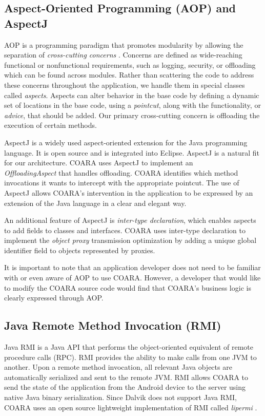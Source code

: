\documentclass[10pt,journal,cspaper,compsoc]{IEEEtran}
\begin{document}
\subsection{Aspect-Oriented Programming (AOP) and AspectJ}
AOP is a programming paradigm that promotes modularity by allowing the separation of \emph{cross-cutting concerns} \cite{AOP_Paper:1997vp}. Concerns are defined as wide-reaching functional or nonfunctional requirements, such as logging, security, or offloading which can be found across modules. Rather than scattering the code to address these concerns throughout the application, we handle them in special classes called \emph{aspects}.  Aspects can alter behavior in the base code by defining a dynamic set of locations in the base code, using a \emph{pointcut}, along with the functionality, or \emph{advice}, that should be added. Our primary cross-cutting concern is offloading the execution of certain methods.

AspectJ \cite{aspectj:Online} is a widely used aspect-oriented extension for the Java programming language. It is open source and is integrated into Eclipse. AspectJ is a natural fit for our architecture.  COARA uses AspectJ to implement an \\\mbox{\emph{OffloadingAspect}} that handles offloading.  COARA identifies which method invocations it wants to intercept with the appropriate pointcut. The use of AspectJ allows COARA's intervention in the application to be expressed by an extension of the Java language in a clear and elegant way.

An additional feature of AspectJ is \emph{inter-type declaration}, which enables aspects to add fields to classes and interfaces.  COARA uses inter-type declaration to implement the \emph{object proxy} transmission optimization by adding a unique global identifier field to objects represented by proxies.

It is important to note that an application developer does not need to be familiar with or even aware of AOP to use COARA.  However, a developer that would like to modify the COARA source code would find that COARA's business logic is clearly expressed through AOP.

\subsection{Java Remote Method Invocation (RMI)}
Java RMI is a Java API that performs the object-oriented equivalent of remote procedure calls (RPC).  RMI provides the ability to make calls from one JVM to another.  Upon a remote method invocation, all relevant Java objects are automatically serialized and sent to the remote JVM.  RMI allows COARA to send the state of the application from the Android device to the server using native Java binary serialization.
Since Dalvik does not support Java RMI, COARA uses an open source lightweight implementation of RMI called \emph{lipermi} \cite{lipermi:Online}.
\end{document}
